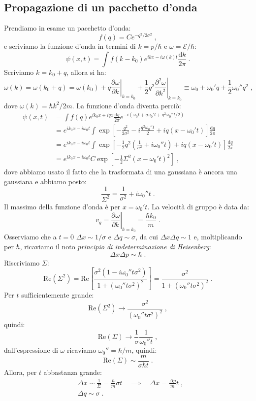 \documentclass[10pt,a4paper]{report}
\theoremstyle{definition}
\newcommand{\pdev}[3][]{\frac{\partial^{#1} #2}{\partial #3^{#1}}}
\numberwithin{equation}{section}
\newcommand{\diff}[1][]{\mathrm{d}#1}
\begin{document}
\subsection*{Propagazione di un pacchetto d'onda}
Prendiamo in esame un pacchetto d'onda:
$$
f(q)=Ce^{-q^2/2\sigma^2}\;,
$$
e scriviamo la funzione d'onda in termini di $k=p/\hbar$ e $\omega=\mathcal{E}/\hbar$:
\begin{equation}
\psi(x,t)=\int f(k-k_0)e^{ikx-i\omega(k)t}\frac{\diff{k}}{2\pi}\;.
\end{equation}
Scriviamo $k=k_0+q$, allora si ha:
$$
\omega(k)=\omega(k_0+q)=\omega(k_0)+q\left.\pdev{\omega}{k}\right|_{k=k_0}+\frac{1}{2}q^2\left.\pdev[2]{\omega}{k}\right|_{k=k_0}\equiv \omega_0+\omega_0'q+\frac{1}{2}\omega_0''q^2\;,
$$
dove $\omega(k)=\hbar k^2/2m$. La funzione d'onda diventa perciò:
\begin{align*}
\psi(x,t)&= \int f(q)e^{ik_0x+iqx}\frac{\diff{q}}{2\pi}e^{-i(\omega_0t+q\omega_0't+q^2\omega_0''t/2)} \\
&= e^{ik_0x-i\omega_0t}\int \exp\left[-\frac{q^2}{2\sigma^2}-i\frac{q^2\omega_0''t}{2}+iq(x-\omega_0't)\right]\frac{\diff{q}}{2\pi} \\
&= e^{ik_0x-i\omega_0t}\int \exp\left[-\frac{1}{2}q^2\left(\frac{1}{\sigma^2}+i\omega_0''t\right)+iq(x-\omega_0't)\right]\frac{\diff{q}}{2\pi}
\\
&=e^{ik_0x-i\omega_0t}C\exp\left[-\frac{1}{2}\Sigma^2(x-\omega_0't)^2\right]\;,
\end{align*}
dove abbiamo usato il fatto che la trasformata di una gaussiana è ancora una gaussiana e abbiamo posto:
$$
\frac{1}{\Sigma^2}=\frac{1}{\sigma^2}+i\omega_0''t\;.
$$
Il massimo della funzione d'onda è per $x=\omega_0't$. La velocità di gruppo è data da:
$$
v_g=\left.\pdev{\omega}{k}\right|_{k=k_0}=\frac{\hbar k_0}{m}\;.
$$
Osserviamo che a $t=0$ $\Delta x \sim 1/\sigma$ e $\Delta q \sim \sigma$, da cui $\Delta x\Delta q \sim 1$ e, moltiplicando per $\hbar$, ricaviamo il noto \textit{principio di indeterminazione di Heisenberg}:
\begin{equation}
\Delta x\Delta p \sim \hbar\;.
\end{equation}
Riscriviamo $\Sigma$:
$$
\mathrm{Re}(\Sigma^2)=\mathrm{Re}\left[\frac{\sigma^2(1-i\omega_0''t\sigma^2)}{1+(\omega_0''t\sigma^2)^2}\right]=\frac{\sigma^2}{1+(\omega_0''t\sigma^2)^2}\;.
$$
Per $t$ sufficientemente grande:
$$
\mathrm{Re}(\Sigma^2)\longrightarrow \frac{\sigma^2}{(\omega_0''t\sigma^2)^2}\;,
$$
quindi:
$$
\mathrm{Re}(\Sigma)\longrightarrow \frac{1}{\sigma}\frac{1}{\omega_0''t}\;,
$$
dall'espressione di $\omega$ ricaviamo $\omega_0''=\hbar/m$, quindi:
$$
\mathrm{Re}(\Sigma)\sim \frac{m}{\sigma\hbar t}\;.
$$
Allora, per $t$ abbastanza grande:
\begin{align*}
&\Delta x\sim \frac{1}{\Sigma}=\frac{\hbar}{m}\sigma t\quad \implies\quad \Delta x=\frac{\Delta p}{m}t\;, \\
&\Delta q\sim\sigma\;.
\end{align*}
\end{document}
